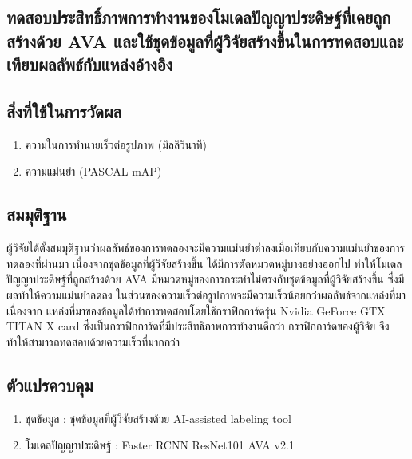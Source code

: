 \subsection{ทดสอบประสิทธิ์ภาพการทำงานของโมเดลปัญญาประดิษฐ์ที่เคยถูกสร้างด้วย AVA และใช้ชุดข้อมูลที่ผู้วิจัยสร้างขึ้นในการทดสอบและเทียบผลลัพธ์กับแหล่งอ้างอิง}
\subsection*{สิ่งที่ใช้ในการวัดผล}
	\begin{enumerate}
		\item ความในการทำนายเร็วต่อรูปภาพ (มิลลิวินาที)
		\item ความแม่นยำ (PASCAL mAP)
	\end{enumerate}
\subsection*{สมมุติฐาน}ผู้วิจัยได้ตั้งสมมุติฐานว่าผลลัพธ์ของการทดลองจะมีความแม่นยำต่ำลงเมื่อเทียบกับความแม่นยำของการทดลองที่ผ่านมา เนื่องจากชุดข้อมูลที่ผู้วิจัยสร้างขึ้น ได้มีการตัดหมวดหมู่บางอย่างออกไป 
ทำให้โมเดลปัญญาประดิษฐ์ที่ถูกสร้างด้วย AVA มีหมวดหมู่ของการกระทำไม่ตรงกับชุดข้อมูลที่ผู้วิจัยสร้างขึ้น ซึ่งมีผลทำให้ความแม่นยำลดลง ในส่วนของความเร็วต่อรูปภาพจะมีความเร็วน้อยกว่าผลลัพธ์จากแหล่งที่มา เนื่องจาก แหล่งที่มาของข้อมูลได้ทำการทดสอบโดยใช้กราฟิกการ์ดรุ่น Nvidia GeForce GTX TITAN X card ซึ่งเป็นกราฟิกการ์ดที่มีประสิทธิภาพการทำงานดีกว่า กราฟิกการ์ดของผู้วิจัย จึงทำให้สามารถทดสอบด้วยความเร็วที่มากกว่า
\subsection*{ตัวแปรควบคุม}
	\begin{enumerate}
		\item ชุดข้อมูล : ชุดข้อมูลที่ผู้วิจัยสร้างด้วย AI-assisted labeling tool
		\item โมเดลปัญญาประดิษฐ์ : Faster RCNN ResNet101 AVA v2.1
	\end{enumerate}
